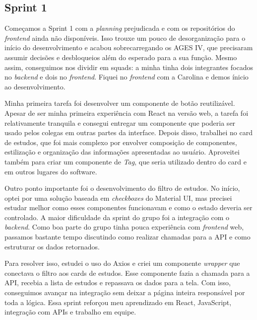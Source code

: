 \subsection{Sprint 1}

Começamos a Sprint 1 com a \textit{planning} prejudicada e com os repositórios do \textit{frontend} ainda não disponíveis. Isso trouxe um pouco de desorganização para o início do desenvolvimento e acabou sobrecarregando os AGES IV, que precisaram assumir decisões e desbloqueios além do esperado para a sua função. Mesmo assim, conseguimos nos dividir em squads: a minha tinha dois integrantes focados no \textit{backend} e dois no \textit{frontend}. Fiquei no \textit{frontend} com a Carolina e demos ínicio ao desenvolvimento.

Minha primeira tarefa foi desenvolver um componente de botão reutilizável. Apesar de ser minha primeira experiência com React na versão web, a tarefa foi relativamente tranquila e consegui entregar um componente que poderia ser usado pelos colegas em outras partes da interface. Depois disso, trabalhei no card de estudos, que foi mais complexo por envolver composição de componentes, estilização e organização das informações apresentadas ao usuário. Aproveitei também para criar um componente de \textit{Tag}, que seria utilizado dentro do card e em outros lugares do software.

Outro ponto importante foi o desenvolvimento do filtro de estudos. No início, optei por uma solução baseada em \textit{checkboxes} do Material UI, mas precisei estudar melhor como esses componentes funcionavam e como o estado deveria ser controlado. A maior dificuldade da sprint do grupo foi a integração com o \textit{backend}. Como boa parte do grupo tinha pouca experiência com \textit{frontend} web, passamos bastante tempo discutindo como realizar chamadas para a API e como estruturar os dados retornados.

Para resolver isso, estudei o uso do Axios e criei um componente \textit{wrapper} que conectava o filtro aos cards de estudos. Esse componente fazia a chamada para a API, recebia a lista de estudos e repassava os dados para a tela. Com isso, conseguimos avançar na integração sem deixar a página inteira responsável por toda a lógica. Essa sprint reforçou meu aprendizado em React, JavaScript, integração com APIs e trabalho em equipe.
